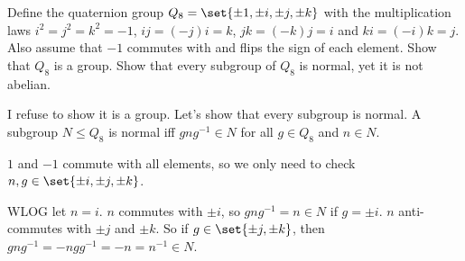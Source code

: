 \documentclass[12pt]{article}
\begin{document}
\begin{problem}
    Define the quaternion group $Q_8 = \set{\pm 1, \pm i, \pm j, \pm k}$
    with the multiplication laws
    $i^2 = j^2 = k^2 = -1$, $ij = (-j)i = k$, $jk = (-k)j = i$
    and $ki = (-i)k = j$.
    Also assume that $-1$ commutes with and flips the sign of each element.
    Show that $Q_8$ is a group.
    Show that every subgroup of $Q_8$ is normal, yet it is not abelian.
\end{problem}
\begin{solution}
    I refuse to show it is a group.
    Let's show that every subgroup is normal.
    A subgroup $N \le Q_8$ is normal iff
    $g n g^{-1} \in N$ for all $g \in Q_8$ and $n \in N$.

    $1$ and $-1$ commute with all elements,
    so we only need to check $n, g \in \set{\pm i, \pm j, \pm k}$.

    WLOG let $n = i$.
    $n$ commutes with $\pm i$, so $gng^{-1} = n \in N$ if $g = \pm i$.
    $n$ anti-commutes with $\pm j$ and $\pm k$.
    So if $g \in \set{\pm j, \pm k}$,
    then $g n g^{-1} = -n g g^{-1} = -n = n^{-1} \in N$.
\end{solution}
\end{document}
